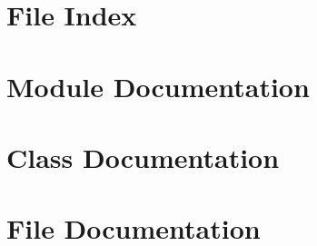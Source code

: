 \documentclass[twoside]{book}
\newcommand{\+}{\discretionary{\mbox{\scriptsize$\hookleftarrow$}}{}{}}
\newcommand{\clearemptydoublepage}{%
  \newpage{\pagestyle{empty}\cleardoublepage}%
}
\begin{document}
\chapter{File Index}

\chapter{Module Documentation}

\chapter{Class Documentation}














\chapter{File Documentation}




























\backmatter
\newpage
{}
\clearemptydoublepage
{}
\printindex
\end{document}
